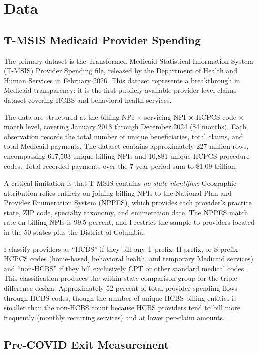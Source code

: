 \documentclass[12pt]{article}
\begin{document}
\section{Data}

\subsection{T-MSIS Medicaid Provider Spending}

The primary dataset is the Transformed Medicaid Statistical Information System (T-MSIS) Provider Spending file, released by the Department of Health and Human Services in February 2026. This dataset represents a breakthrough in Medicaid transparency: it is the first publicly available provider-level claims dataset covering HCBS and behavioral health services.

The data are structured at the billing NPI $\times$ servicing NPI $\times$ HCPCS code $\times$ month level, covering January 2018 through December 2024 (84 months). Each observation records the total number of unique beneficiaries, total claims, and total Medicaid payments. The dataset contains approximately 227 million rows, encompassing 617,503 unique billing NPIs and 10,881 unique HCPCS procedure codes. Total recorded payments over the 7-year period sum to \$1.09 trillion.

A critical limitation is that T-MSIS contains \emph{no state identifier}. Geographic attribution relies entirely on joining billing NPIs to the National Plan and Provider Enumeration System (NPPES), which provides each provider's practice state, ZIP code, specialty taxonomy, and enumeration date. The NPPES match rate on billing NPIs is 99.5 percent, and I restrict the sample to providers located in the 50 states plus the District of Columbia.

I classify providers as ``HCBS'' if they bill any T-prefix, H-prefix, or S-prefix HCPCS codes (home-based, behavioral health, and temporary Medicaid services) and ``non-HCBS'' if they bill exclusively CPT or other standard medical codes. This classification produces the within-state comparison group for the triple-difference design. Approximately 52 percent of total provider spending flows through HCBS codes, though the number of unique HCBS billing entities is smaller than the non-HCBS count because HCBS providers tend to bill more frequently (monthly recurring services) and at lower per-claim amounts.

\subsection{Pre-COVID Exit Measurement}
\end{document}
